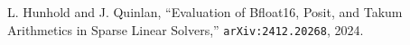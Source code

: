  L. Hunhold and J. Quinlan, ``Evaluation of Bfloat16, Posit, and Takum Arithmetics in Sparse Linear Solvers,''
  \texttt{arXiv:2412.20268}, 2024.



